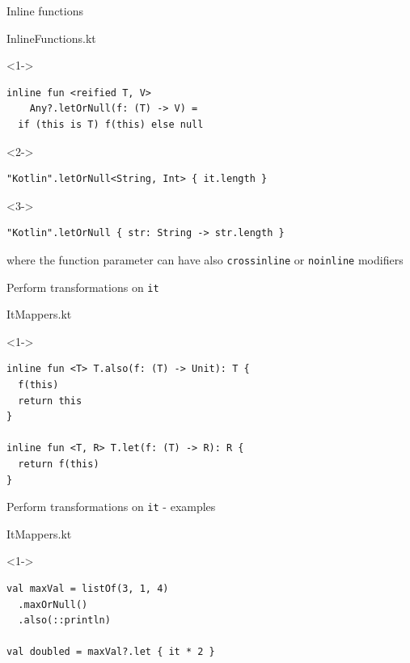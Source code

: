 \documentclass[hyperref={pdfpagelabels=false},xcolor={dvipsnames},compress]{beamer}
\begin{document}
    \begin{frame}[fragile]{Inline functions}
        \begin{exampleblock}{InlineFunctions.kt}
            \begin{onlyenv}<1->
                \begin{lstlisting}
inline fun <reified T, V>
    Any?.letOrNull(f: (T) -> V) =
  if (this is T) f(this) else null
                \end{lstlisting}
            \end{onlyenv}
            \begin{onlyenv}<2->
                \begin{lstlisting}
"Kotlin".letOrNull<String, Int> { it.length }
                \end{lstlisting}
            \end{onlyenv}
            \begin{onlyenv}<3->
                \begin{lstlisting}
"Kotlin".letOrNull { str: String -> str.length }
                \end{lstlisting}
            \end{onlyenv}
        \end{exampleblock}
        where the function parameter can have also \texttt{crossinline} or \texttt{noinline} modifiers
    \end{frame}

    \begin{frame}[fragile]{Perform transformations on \texttt{it}}
        \begin{exampleblock}{ItMappers.kt}
            \begin{onlyenv}<1->
                \begin{lstlisting}
inline fun <T> T.also(f: (T) -> Unit): T {
  f(this)
  return this
}

inline fun <T, R> T.let(f: (T) -> R): R {
  return f(this)
}
                \end{lstlisting}
            \end{onlyenv}
        \end{exampleblock}
    \end{frame}

    \begin{frame}[fragile]{Perform transformations on \texttt{it} - examples}
        \begin{exampleblock}{ItMappers.kt}
            \begin{onlyenv}<1->
                \begin{lstlisting}
val maxVal = listOf(3, 1, 4)
  .maxOrNull()
  .also(::println)

val doubled = maxVal?.let { it * 2 }
                \end{lstlisting}
            \end{onlyenv}
        \end{exampleblock}
    \end{frame}
\end{document}
